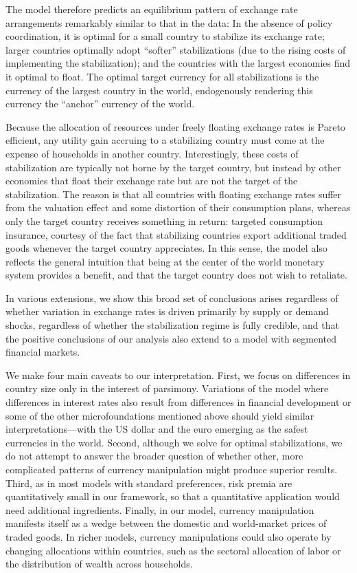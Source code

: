 \documentclass[12pt,letter]{article}
\theoremstyle{break} \theorembodyfont{\normalfont\itshape}
\theoremstyle{break}
\theoremstyle{break} \theorembodyfont{\normalfont\itshape}
\theoremstyle{break} \theorembodyfont{\normalfont\itshape}
\begin{document}
{ The model therefore predicts an equilibrium pattern of exchange rate
  arrangements remarkably similar to that in the data: In the absence
  of policy coordination, it is optimal for a small country to
  stabilize its exchange rate; larger countries optimally adopt
  ``softer'' stabilizations (due to the rising costs of implementing
  the stabilization); and the countries with the largest economies
  find it optimal to float. The optimal target currency for all
  stabilizations is the currency of the largest country in the world,
  endogenously rendering this currency the ``anchor'' currency of the
  world. }

Because the allocation of resources under freely floating exchange
rates is Pareto efficient, any utility gain accruing to a stabilizing
country must come at the expense of households in another country.
Interestingly, these costs of stabilization are typically not borne by
the target country, but instead by other economies that float their
exchange rate but are not the target of the stabilization. The reason
is that all countries with floating exchange rates suffer from the
valuation effect and some distortion of their consumption plans,
whereas only the target country receives something in return: targeted
consumption insurance, courtesy of the fact that stabilizing countries
export additional traded goods whenever the target country
appreciates. In this sense, the model also reflects the general
intuition that being at the center of the world monetary system
provides a benefit, and that the target country does not wish to
retaliate.



In various extensions, we show this broad set of conclusions arises
regardless of whether variation in exchange rates is driven primarily
by supply or demand shocks, regardless of whether the stabilization
regime is fully credible, and that the positive conclusions of our
analysis also extend to a model with segmented financial markets.



We make four main caveats to our interpretation. First, we focus on
differences in country size only in the interest of parsimony.
Variations of the model where differences in interest rates also
result from differences in financial development or some of the other
microfoundations mentioned above should yield similar
interpretations---with the US dollar and the euro emerging as the
safest currencies in the world. Second, although we solve for optimal
stabilizations, we do not attempt to answer the broader question of
whether other, more complicated patterns of currency manipulation
might produce superior results. Third, as in most models with standard
preferences, risk premia are quantitatively small in our framework, so
that a quantitative application would need additional ingredients.
Finally, in our model, currency manipulation manifests itself as a
wedge between the domestic and world-market prices of traded goods. In
richer models, currency manipulations could also operate by changing
allocations within countries, such as the sectoral allocation of labor
or the distribution of wealth across households.
 
\end{document}
